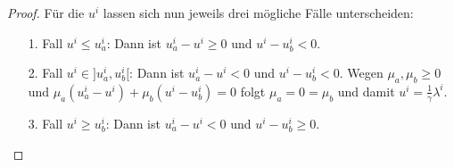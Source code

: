 \begin{compactenum}[(i)]
\begin{proof}
Für die $u^i$ lassen sich nun jeweils drei mögliche Fälle unterscheiden:
\begin{enumerate}
\item[1.] Fall $u^i\leq u_a^i$: Dann ist $u_a^i-u^i\geq 0$ und $u^i-u_b^i<0$.
\item[2.] Fall $u^i\in]u_a^i,u_b^i[$: Dann ist $u_a^i-u^i<0$ und $u^i-u_b^i<0$. Wegen $\mu_a,\mu_b\geq 0$ und $\mu_a(u_a^i-u^i)+\mu_b(u^i-u_b^i)=0$ folgt $\mu_a=0=\mu_b$ und damit $u^i=\frac{1}{\gamma}\lambda^i$.
\item[3.] Fall $u^i\geq u_b^i$: Dann ist $u_a^i-u^i<0$ und $u^i-u_b^i\geq 0$.
\end{enumerate}
\end{proof}
\end{compactenum}
